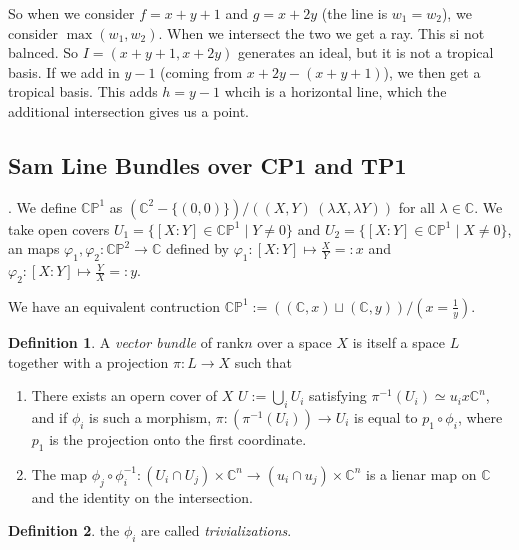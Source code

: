 \documentclass[11pt]{article}
\theoremstyle{definition}
\newtheorem{protodefinition}{Definition}[section]
\newenvironment{define}
   {\begin{protodefinition}}
   {\end{protodefinition}}
\def\CC{{\mathbb C}}
\def\PP{{\mathbb P}}
\begin{document}
So when we consider $f=x+y+1$ and $ g= x+2y$ (the line is $w_1=w_2$), we consider $\max(w_1,w_2)$. When we intersect the two we get a ray. This si not balnced. So $I=(x+y+1,x+2y)$ generates an ideal, but it is not a tropical basis. If we add in $y-1$ (coming from $x+2y-(x+y+1)$), we then get a tropical basis. This adds $h=y-1$ whcih is a horizontal line, which the additional intersection gives us a point.




\subsection{Sam Line Bundles over CP1 and TP1}

\center{Manifold Structure on $\CC\PP^1$}

. We define $\CC\PP^1$ as $(\CC^2-\{(0,0)\})/ ( (X,Y) ~ (\lambda X,\lambda Y))$ for all $\lambda \in \CC$. We take open covers $U_1 = \{[X:Y] \in \CC\PP^1 \; |\; Y \neq 0\}$ and $U_2 = \{[X:Y] \in \CC\PP^1 \; |\; X \neq 0\}$, an maps $\varphi_1,\varphi_2:\CC\PP^2 \rightarrow \CC$ defined by $\varphi_1:[X:Y]\mapsto \frac{X}{Y}=: x$ and $\varphi_2:[X:Y]\mapsto \frac{Y}{X} =: y$. 


We have an equivalent contruction $\CC\PP^1:= ( (\CC,x) \sqcup (\CC,y))/(x=\frac{1}{y})$.




\begin{define}
    A \emph{vector bundle} of rank$ n$ over a space $X$ is itself a space $L$ together with a projection $\pi:L \rightarrow X$ such that
    \begin{enumerate}
        \item There exists an opern cover of $X$ $U:= \bigcup\limits_i U_i$ satisfying $\pi^{-1} (U_i) \simeq u_ix\CC^n$, and if $\phi_i$ is such a morphism, $\pi:(\pi^{-1}(U_i))\rightarrow U_i$ is equal to $p_1\circ \phi_i$, where $p_1$ is the projection onto the first coordinate.
        \item The map $\phi_j \circ \phi_i^{-1}:(U_i \cap U_j) \times \CC^n \rightarrow (u_i \cap u_j)\times \CC^n$ is a lienar map on $\CC$ and the identity on the intersection.
    \end{enumerate}
\end{define}

\begin{define}
    the $\phi_i$ are called \emph{trivializations}. 
\end{define}
\end{document}
